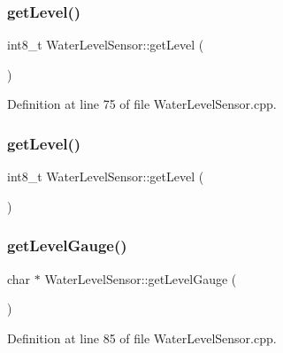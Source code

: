 \subsubsection{\texorpdfstring{get\+Level()}{getLevel()}\hspace{0.1cm}{\footnotesize\ttfamily [1/2]}}
{\footnotesize\ttfamily int8\+\_\+t Water\+Level\+Sensor\+::get\+Level (\begin{DoxyParamCaption}{ }\end{DoxyParamCaption})}



Definition at line 75 of file Water\+Level\+Sensor.\+cpp.

\mbox{\label{class_water_level_sensor_ae5a376c1a3ba9cc65a957f1c5cd6ddc0}} 
\subsubsection{\texorpdfstring{get\+Level()}{getLevel()}\hspace{0.1cm}{\footnotesize\ttfamily [2/2]}}
{\footnotesize\ttfamily int8\+\_\+t Water\+Level\+Sensor\+::get\+Level (\begin{DoxyParamCaption}{ }\end{DoxyParamCaption})}

\mbox{\label{class_water_level_sensor_ac0fe047b12952693055ed7222d7a4aaa}} 
\subsubsection{\texorpdfstring{get\+Level\+Gauge()}{getLevelGauge()}\hspace{0.1cm}{\footnotesize\ttfamily [1/2]}}
{\footnotesize\ttfamily char $\ast$ Water\+Level\+Sensor\+::get\+Level\+Gauge (\begin{DoxyParamCaption}{ }\end{DoxyParamCaption})}



Definition at line 85 of file Water\+Level\+Sensor.\+cpp.

